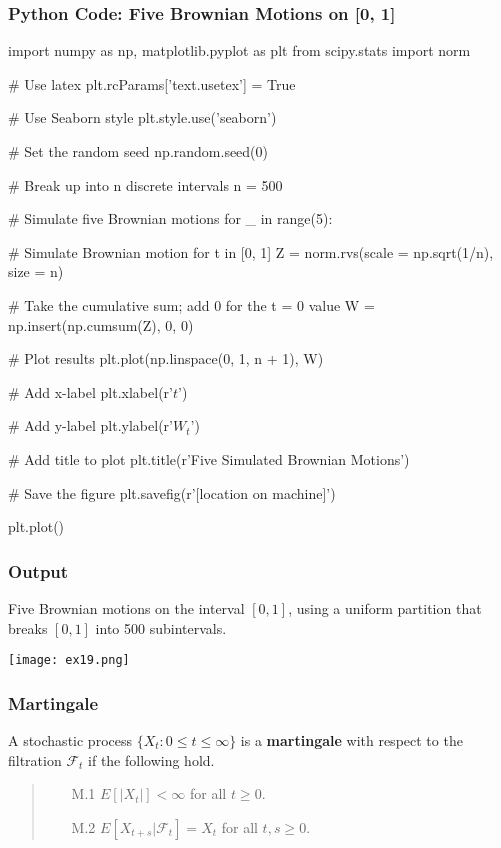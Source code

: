 \documentclass{beamer}
\begin{document}
\begin{frame}[fragile]
\frametitle{Python Code: Five Brownian Motions on [0, 1]}

{
\linespread{0.7}
\tiny
\begin{verbatim*}
import numpy as np, matplotlib.pyplot as plt
from scipy.stats import norm

# Use latex
plt.rcParams['text.usetex'] = True

# Use Seaborn style
plt.style.use('seaborn')

# Set the random seed
np.random.seed(0)

# Break up into n discrete intervals
n = 500

# Simulate five Brownian motions
for _ in range(5):
    
    # Simulate Brownian motion for t in [0, 1]
    Z = norm.rvs(scale = np.sqrt(1/n), size = n)
    
    # Take the cumulative sum; add 0 for the t = 0 value
    W = np.insert(np.cumsum(Z), 0, 0)
    
    # Plot results
    plt.plot(np.linspace(0, 1, n + 1), W)
    
# Add x-label
plt.xlabel(r'$t$')

# Add y-label
plt.ylabel(r'$W_t$')

# Add title to plot
plt.title(r'Five Simulated Brownian Motions')

# Save the figure
plt.savefig(r'[location on machine]')

plt.plot()
\end{verbatim*}
 }

\end{frame}

\begin{frame}
\frametitle{Output}
Five Brownian motions on the interval $[0, 1]$, using a uniform partition that breaks $[0, 1]$ into 500 subintervals. 
\begin{center}
\texttt{[image: ex19.png]}
\end{center}


\end{frame}


\begin{frame}
\frametitle{Martingale} 

\begin{Definition}
A stochastic process $\{X_t : 0\leq t \leq\infty\}$ is a {\bf martingale} with respect to the filtration $\mathcal{F}_t$ if the following hold.
\medskip

\begin{quote}
\begin{enumerate}
\item[M.1] $E\left[|X_t|\right] <\infty$ for all $t\geq 0$.
\item[M.2] $E\left[ X_{t + s} | \mathcal{F}_t\right] = X_t$ for all $t, s \geq 0$.
\end{enumerate}
\end{quote}
\end{Definition}

\end{frame}
\end{document}
